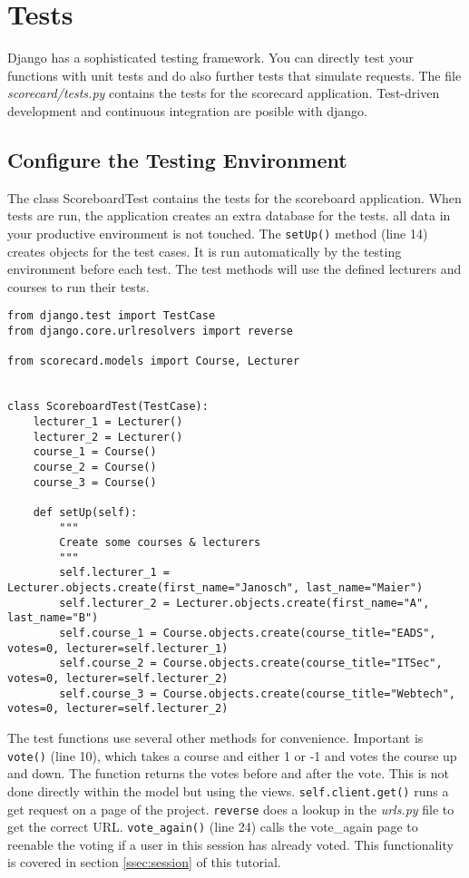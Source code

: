 \section{Tests}

Django has a sophisticated testing framework. You can directly test your functions with unit tests and do also further tests that simulate requests. The file \emph{scorecard/tests.py} contains the tests for the scorecard application. Test-driven development and continuous integration are posible with django.

\subsection{Configure the Testing Environment}
The class ScoreboardTest contains the tests for the scoreboard application. When tests are run, the application creates an extra database for the tests. all data in your productive environment is not touched. The \lstinline|setUp()| method (line 14) creates objects for the test cases. It is run automatically by the testing environment before each test. The test methods will use the defined lecturers and courses to run their tests.

\begin{lstlisting}[style=Python, caption=Exceprt from scorecard/tests.py, label=lst:tests.py]
from django.test import TestCase
from django.core.urlresolvers import reverse

from scorecard.models import Course, Lecturer


class ScoreboardTest(TestCase):
    lecturer_1 = Lecturer()
    lecturer_2 = Lecturer()
    course_1 = Course()
    course_2 = Course()
    course_3 = Course()

    def setUp(self):
        """
        Create some courses & lecturers
        """
        self.lecturer_1 = Lecturer.objects.create(first_name="Janosch", last_name="Maier")
        self.lecturer_2 = Lecturer.objects.create(first_name="A", last_name="B")
        self.course_1 = Course.objects.create(course_title="EADS", votes=0, lecturer=self.lecturer_1)
        self.course_2 = Course.objects.create(course_title="ITSec", votes=0, lecturer=self.lecturer_2)
        self.course_3 = Course.objects.create(course_title="Webtech", votes=0, lecturer=self.lecturer_2)
\end{lstlisting}

The test functions use several other methods for convenience. Important is \lstinline|vote()| (line 10), which takes a course and either 1 or -1 and votes the course up and down. The function returns the votes before and after the vote. This is not done directly within the model but using the views. \lstinline|self.client.get()| runs a get request on a page of the project. \lstinline|reverse| does a lookup in the \emph{urls.py} file to get the correct URL. \lstinline|vote_again()| (line 24) calls the vote\_again page to reenable the voting if a user in this session has already voted. This functionality is covered in section \ref{ssec:session} of this tutorial.

